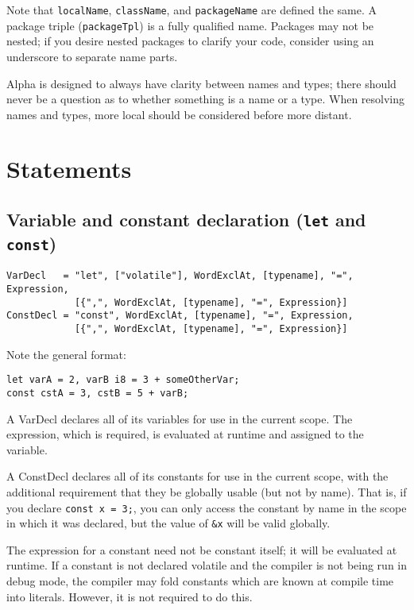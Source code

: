 \documentclass{article}
\begin{document}
Note that \texttt{localName}, \texttt{className}, and \texttt{packageName} are
defined the same. A package triple (\texttt{packageTpl}) is a fully qualified
name. Packages may not be nested; if you desire nested packages to clarify your
code, consider using an underscore to separate name parts.

Alpha is designed to always have clarity between names and types; there should
never be a question as to whether something is a name or a type. When resolving
names and types, more local should be considered before more distant.

\section{Statements}
\label{sec:statements}

\subsection{Variable and constant declaration (\texttt{let} and \texttt{const})}
\label{sub:statements:vardecl}
\begin{verbatim}
VarDecl   = "let", ["volatile"], WordExclAt, [typename], "=", Expression,
            [{",", WordExclAt, [typename], "=", Expression}]
ConstDecl = "const", WordExclAt, [typename], "=", Expression,
            [{",", WordExclAt, [typename], "=", Expression}]
\end{verbatim}
Note the general format:
\begin{verbatim}
let varA = 2, varB i8 = 3 + someOtherVar;
const cstA = 3, cstB = 5 + varB;
\end{verbatim}
A VarDecl declares all of its variables for use in the current scope. The
expression, which is required, is evaluated at runtime and assigned to the
variable.

A ConstDecl declares all of its constants for use in the current scope, with the
additional requirement that they be globally usable (but not by name). That is,
if you declare \texttt{const~x~=~3;}, you can only access the constant by name in
the scope in which it was declared, but the value of \texttt{\&x} will be valid
globally.

The expression for a constant need not be constant itself; it will be evaluated
at runtime. If a constant is not declared volatile and the compiler is not being
run in debug mode, the compiler may fold constants which are known at compile time
into literals. However, it is not required to do this.
\end{document}
